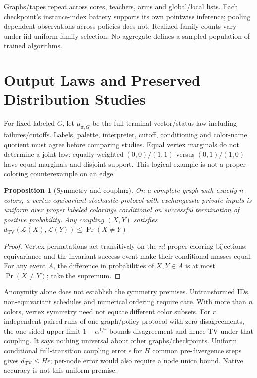 \documentclass[10pt]{article}
\newtheorem{proposition}{Proposition}
\newcommand{\TV}{d_{\mathrm{TV}}}
\begin{document}
Graphs/tapes repeat across cores, teachers, arms and global/local lists.
Each checkpoint's instance-index battery supports its own pointwise
inference; pooling dependent observations across policies does not. Realized
family counts vary under iid uniform family selection. No aggregate defines
a sampled population of trained algorithms.



\section{Output Laws and Preserved Distribution Studies}\label{app:laws}
For fixed labeled $G$, let $\mu_{\pi,G}$ be the full terminal-vector/status
law including failures/cutoffs. Labels, palette, interpreter, cutoff,
conditioning and color-name quotient must agree before comparing studies.
Equal vertex marginals do not determine a joint law: equally weighted
$(0,0)/(1,1)$ versus $(0,1)/(1,0)$ have equal marginals and disjoint support.
This logical example is not a proper-coloring counterexample on an edge.
\begin{proposition}[Symmetry and coupling]
On a complete graph with exactly $n$ colors, a vertex-equivariant stochastic
protocol with exchangeable private inputs is uniform over proper labeled
colorings conditional on successful termination of positive probability.
Any coupling $(X,Y)$ satisfies $\TV(\mathcal L(X),\mathcal L(Y))\le\Pr(X\ne Y)$.
\end{proposition}
\begin{proof}
Vertex permutations act transitively on the $n!$ proper coloring bijections;
equivariance and the invariant success event make their conditional masses
equal. For any event $A$, the difference in probabilities of $X,Y\in A$ is
at most $\Pr(X\ne Y)$; take the supremum.
\end{proof}
Anonymity alone does not establish the symmetry premises. Untransformed IDs,
non-equivariant schedules and numerical ordering require care. With more than
$n$ colors, vertex symmetry need not equate different color subsets.
For $r$ independent paired runs of one graph/policy protocol with zero
disagreements, the one-sided upper limit $1-\alpha^{1/r}$ bounds disagreement
and hence TV under that coupling. It says nothing universal about other
graphs/checkpoints. Uniform conditional full-transition coupling error
$\epsilon$ for $H$ common pre-divergence steps gives $\TV\le H\epsilon$;
per-node error would also require a node union bound. Native accuracy is not
this uniform premise.
\end{document}
